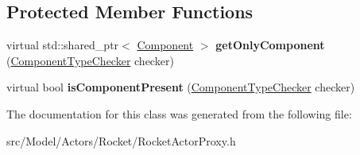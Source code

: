 \subsection*{Protected Member Functions}
\begin{DoxyCompactItemize}
\item 
virtual std\+::shared\+\_\+ptr$<$ \hyperlink{classComponent}{Component} $>$ {\bfseries get\+Only\+Component} (\hyperlink{classComponentTypeChecker}{Component\+Type\+Checker} checker)\hypertarget{classRocketActorProxy_a6139404a8b272dab84c97068f98ea5bf}{}\label{classRocketActorProxy_a6139404a8b272dab84c97068f98ea5bf}

\item 
virtual bool {\bfseries is\+Component\+Present} (\hyperlink{classComponentTypeChecker}{Component\+Type\+Checker} checker)\hypertarget{classRocketActorProxy_a10d5f29f864dc6888198345dd648b180}{}\label{classRocketActorProxy_a10d5f29f864dc6888198345dd648b180}

\end{DoxyCompactItemize}


The documentation for this class was generated from the following file\+:\begin{DoxyCompactItemize}
\item 
src/\+Model/\+Actors/\+Rocket/Rocket\+Actor\+Proxy.\+h\end{DoxyCompactItemize}
